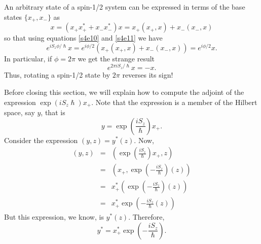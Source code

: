 \documentclass{article}
\numberwithin{equation}{section}
\theoremstyle{plain}
\numberwithin{thm}{section}
\theoremstyle{plain}
\numberwithin{prop}{section}
\theoremstyle{definition}
\numberwithin{defn}{section}
\theoremstyle{remark}
\begin{document}
An arbitrary state of a spin-1/2 system can be expressed in terms of the
base states $\{x_+, x_-\}$ as
\begin{equation}\label{s4e30}
x = (x_+x_+^\ast + x_-x_-^\ast)x = x_+(x_+, x) + x_-(x_-, x)
\end{equation}
so that using equations \eqref{s4e10} and \eqref{s4e11} we have
\begin{equation}\label{s4e31}
e^{iS_z\phi/\hslash}x = e^{i\phi/2}(x_+(x_+,x)+x_-(x_-,x))=e^{i\phi/2}x.
\end{equation}
In particular, if $\phi = 2\pi$ we get the strange result
\begin{equation}\label{s4e32}
e^{2\pi i S_z/\hslash}x = -x.
\end{equation}
Thus, rotating a spin-1/2 state by $2\pi$ reverses its sign!

Before closing this section, we will explain how to compute the adjoint of
the expression $\exp(iS_z\hslash)x_+$. Note that the expression is a member
of the Hilbert space, say $y$, that is
\begin{equation}\label{s4e33}
y = \exp\left(\frac{iS_z}{\hslash}\right)x_+.
\end{equation}
Consider the expression $(y, z) = y^\ast(z)$. Now,
\begin{eqnarray*}
(y, z) &=& \left(\exp\left(\frac{iS_z}{\hslash}\right)x_+, z\right) \\
 &=& \left(x_+, \exp\left(-\frac{iS_z}{\hslash}\right)(z)\right) \\
 &=&  x_+^\ast\left(\exp\left(-\frac{iS_z}{\hslash}\right)(z)\right) \\
 &=&  x_+^\ast\exp\left(-\frac{iS_z}{\hslash}(z)\right)
\end{eqnarray*}
But this expression, we know, is $y^\ast(z)$. Therefore,
\begin{equation}\label{s4e34}
y^\ast = x_+^\ast\exp\left(-\frac{iS_z}{\hslash}\right).
\end{equation}
\end{document}

